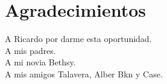 \chapter*{Agradecimientos}

\hspace*{1cm} A Ricardo por darme esta oportunidad.\\
\hspace*{1cm} A mis padres.\\
\hspace*{1cm} A mi novia Bethsy.\\
\hspace*{1cm} A mis amigos Talavera, Alber Bkn y Case.\\